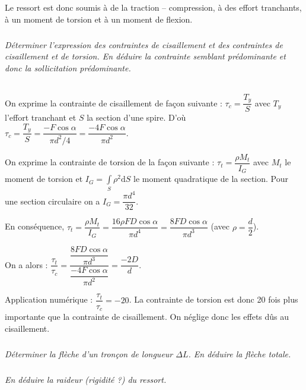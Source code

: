 \documentclass[10pt,fleqn]{article} %
\begin{document}
\begin{multicols}{2}
\begin{corrige}
Le ressort est donc soumis à de la traction -- compression, à des effort tranchants, à un moment de torsion et à un moment de flexion.

\end{corrige}
\else
\fi

\subparagraph{}\textit{Déterminer l'expression des contraintes de cisaillement et des contraintes de cisaillement et de torsion. En déduire la contrainte semblant prédominante et donc la sollicitation prédominante.}

\ifprof
\begin{corrige}~\\
On exprime la contrainte de cisaillement de façon suivante : $\tau_c = \dfrac{T_y}{S}$ avec $T_y$ l'effort tranchant et $S$ la section d'une spire. D'où 
$
\tau_c = \dfrac{T_y}{S} = \dfrac{-F \cos \alpha }{\pi d^2 /4} = \dfrac{- 4 F \cos \alpha }{\pi d^2} 
$.

On exprime la contrainte de torsion de la façon suivante : 
$\tau_t = \dfrac{\rho M_t}{I_G}$ avec $M_t$ le moment de torsion et $I_G=\int\limits_S \rho^2 \text{d}S$ le moment quadratique de la section. Pour une section circulaire on a $I_G = \dfrac{\pi d^4}{32}$. 

En conséquence, 
$\tau_t = \dfrac{\rho M_t}{I_G}
=\dfrac{16 \rho FD\cos\alpha}{\pi d^4}
=\dfrac{8  FD\cos\alpha}{\pi d^3}
$ (avec $\rho=\dfrac{d}{2}$).

On a alors : 
$\dfrac{\tau_t}{\tau_c}
=\dfrac{\dfrac{8  FD\cos\alpha}{\pi d^3}}{\dfrac{- 4 F \cos \alpha }{\pi d^2}}
=\dfrac{-2  D}{ d}
$.

Application numérique : $\dfrac{\tau_t}{\tau_c}=-20$. La contrainte de torsion est donc 20 fois plus importante que la contrainte de cisaillement. On néglige donc les effets dûs au cisaillement. 

\end{corrige}
\else
\fi


\subparagraph{}\textit{Déterminer la flèche d'un tronçon de longueur $\Delta L$. En déduire la flèche totale.}


\subparagraph{}\textit{En déduire la raideur (rigidité ?) du ressort.}
\end{multicols}
\end{document}
